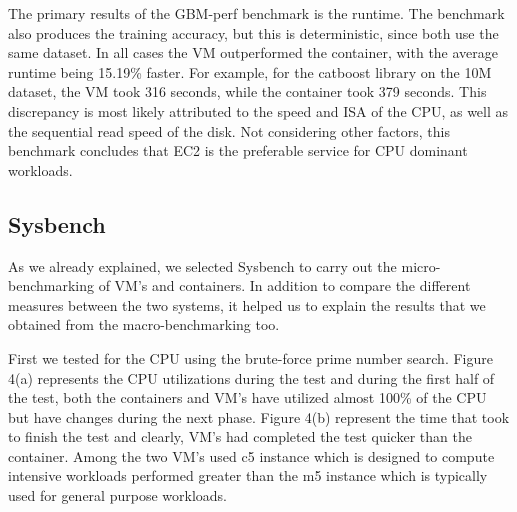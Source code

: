 \documentclass[11pt]{article}
\begin{document}
The primary results of the GBM-perf benchmark is the runtime. The benchmark also produces the training accuracy, but this is deterministic, since both use the same dataset. In all cases the VM outperformed the container, with the average runtime being 15.19\% faster. For example, for the catboost library on the 10M dataset, the VM took 316 seconds, while the container took 379 seconds. This discrepancy is most likely attributed to the speed and ISA of the CPU, as well as the sequential read speed of the disk. Not considering other factors, this benchmark concludes that EC2 is the preferable service for CPU dominant workloads.


\subsection{Sysbench}

As we already explained, we selected Sysbench to carry out the micro-benchmarking of VM's and containers. In addition to compare the different measures between the two systems, it helped us to explain the results that we obtained from the macro-benchmarking too. 

First we tested for the CPU using the brute-force prime number search. Figure 4(a) represents the CPU utilizations during the test and during the first half of the test, both the containers and VM's have utilized almost 100\% of the CPU but have changes during the next phase. Figure 4(b) represent the time that took to finish the test and clearly, VM's had completed the test quicker than the container. Among the two VM's used c5 instance which is designed to compute intensive workloads performed greater than the m5 instance which is typically used for general purpose workloads. 
\end{document}
